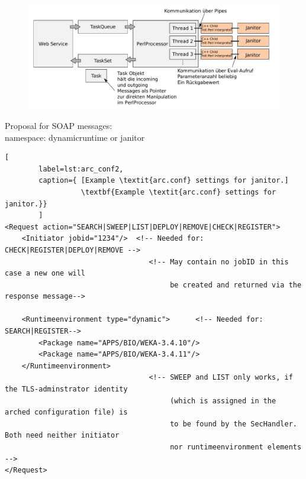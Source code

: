 \begin{figure}[!h]
  \begin{center}
    \includegraphics[width=12cm]{images/WS_structure.pdf}
    \label{fig:WS_structure}
  \end{center}
\end{figure}

Proposal for SOAP messages:\\
 namespace: dynamicruntime or janitor\\
\begin{lstlisting}[
        label=lst:arc_conf2,
        caption={ [Example \textit{arc.conf} settings for janitor.]
                  \textbf{Example \textit{arc.conf} settings for janitor.}}
        ]
<Request action="SEARCH|SWEEP|LIST|DEPLOY|REMOVE|CHECK|REGISTER">
	<Initiator jobid="1234"/>  <!-- Needed for: CHECK|REGISTER|DEPLOY|REMOVE -->
                                  <!-- May contain no jobID in this case a new one will 
                                       be created and returned via the response message-->

	<Runtimeenvironment type="dynamic">      <!-- Needed for: SEARCH|REGISTER-->
		<Package name="APPS/BIO/WEKA-3.4.10"/>
		<Package name="APPS/BIO/WEKA-3.4.11"/>
	</Runtimeenvironment>
                                  <!-- SWEEP and LIST only works, if the TLS-adminstrator identity 
                                       (which is assigned in the arched configuration file) is
                                       to be found by the SecHandler. Both need neither initiator 
                                       nor runtimeenvironment elements -->
</Request>
\end{lstlisting}


